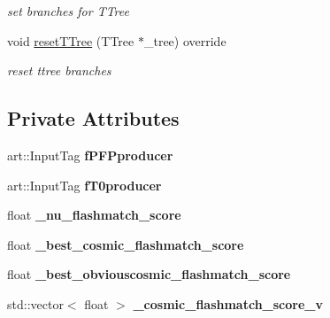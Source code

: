 \begin{DoxyCompactItemize}
\begin{DoxyCompactList}\small\item\em set branches for T\+Tree \end{DoxyCompactList}\item 
void \hyperlink{classanalysis_1_1FlashMatching_ac9f3186d0a7acb4723959687710f7bab}{reset\+T\+Tree} (T\+Tree $\ast$\+\_\+tree) override\hypertarget{classanalysis_1_1FlashMatching_ac9f3186d0a7acb4723959687710f7bab}{}\label{classanalysis_1_1FlashMatching_ac9f3186d0a7acb4723959687710f7bab}

\begin{DoxyCompactList}\small\item\em reset ttree branches \end{DoxyCompactList}\end{DoxyCompactItemize}
\subsection*{Private Attributes}
\begin{DoxyCompactItemize}
\item 
art\+::\+Input\+Tag {\bfseries f\+P\+F\+Pproducer}\hypertarget{classanalysis_1_1FlashMatching_ab08a41fbfa79153063d300f2f00cf2ce}{}\label{classanalysis_1_1FlashMatching_ab08a41fbfa79153063d300f2f00cf2ce}

\item 
art\+::\+Input\+Tag {\bfseries f\+T0producer}\hypertarget{classanalysis_1_1FlashMatching_adc40aeaba0f5c6e5db982a2630a5c869}{}\label{classanalysis_1_1FlashMatching_adc40aeaba0f5c6e5db982a2630a5c869}

\item 
float {\bfseries \+\_\+nu\+\_\+flashmatch\+\_\+score}\hypertarget{classanalysis_1_1FlashMatching_ad5378659d44adbf60961370b7e09059f}{}\label{classanalysis_1_1FlashMatching_ad5378659d44adbf60961370b7e09059f}

\item 
float {\bfseries \+\_\+best\+\_\+cosmic\+\_\+flashmatch\+\_\+score}\hypertarget{classanalysis_1_1FlashMatching_a1272dc1455e89eea53d439c1789562c5}{}\label{classanalysis_1_1FlashMatching_a1272dc1455e89eea53d439c1789562c5}

\item 
float {\bfseries \+\_\+best\+\_\+obviouscosmic\+\_\+flashmatch\+\_\+score}\hypertarget{classanalysis_1_1FlashMatching_a37d29c4362498710cb68584518ee4ec6}{}\label{classanalysis_1_1FlashMatching_a37d29c4362498710cb68584518ee4ec6}

\item 
std\+::vector$<$ float $>$ {\bfseries \+\_\+cosmic\+\_\+flashmatch\+\_\+score\+\_\+v}\hypertarget{classanalysis_1_1FlashMatching_a4a23f572bbc5503c07fdd410d7742598}{}\label{classanalysis_1_1FlashMatching_a4a23f572bbc5503c07fdd410d7742598}

\end{DoxyCompactItemize}


